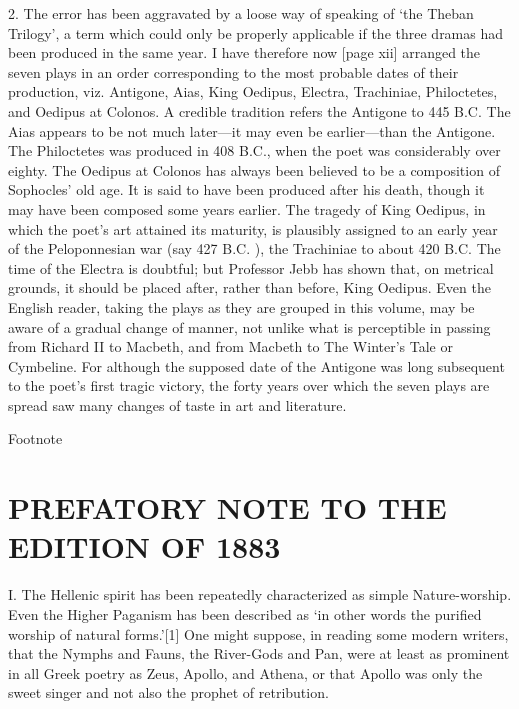 \documentclass[11pt,letter]{book}
\begin{document}
\par  2. The error has been aggravated by a loose way of speaking of ‘the Theban Trilogy’, a term which could only be properly applicable if the three dramas had been produced in the same year. I have therefore now [page xii] arranged the seven plays in an order corresponding to the most probable dates of their production, viz. Antigone, Aias, King Oedipus, Electra, Trachiniae, Philoctetes, and Oedipus at Colonos. A credible tradition refers the Antigone to 445 B.C. The Aias appears to be not much later—it may even be earlier—than the Antigone. The Philoctetes was produced in 408 B.C., when the poet was considerably over eighty. The Oedipus at Colonos has always been believed to be a composition of Sophocles’ old age. It is said to have been produced after his death, though it may have been composed some years earlier. The tragedy of King Oedipus, in which the poet’s art attained its maturity, is plausibly assigned to an early year of the Peloponnesian war (say 427 B.C. ), the Trachiniae to about 420 B.C. The time of the Electra is doubtful; but Professor Jebb has shown that, on metrical grounds, it should be placed after, rather than before, King Oedipus. Even the English reader, taking the plays as they are grouped in this volume, may be aware of a gradual change of manner, not unlike what is perceptible in passing from Richard II to Macbeth, and from Macbeth to The Winter’s Tale or Cymbeline. For although the supposed date of the Antigone was long subsequent to the poet’s first tragic victory, the forty years over which the seven plays are spread saw many changes of taste in art and literature.

\par  Footnote
\section{PREFATORY NOTE TO THE EDITION OF 1883}
\par  I. The Hellenic spirit has been repeatedly characterized as simple Nature-worship. Even the Higher Paganism has been described as ‘in other words the purified worship of natural forms.’[1] One might suppose, in reading some modern writers, that the Nymphs and Fauns, the River-Gods and Pan, were at least as prominent in all Greek poetry as Zeus, Apollo, and Athena, or that Apollo was only the sweet singer and not also the prophet of retribution.
\end{document}
